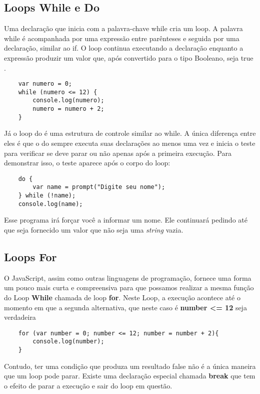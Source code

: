 \subsection{Loops While e Do}

Uma declaração que inicia com a palavra-chave while cria um loop. A palavra while é acompanhada por uma expressão entre parênteses e seguida por uma declaração, similar ao if. O loop continua executando a declaração enquanto a expressão produzir um valor que, após convertido para o tipo Booleano, seja true \cite{haverbeke2014eloquent}.

\begin{lstlisting}
	var numero = 0;
	while (numero <= 12) {
		console.log(numero);
		numero = numero + 2;
	}
\end{lstlisting}

Já o loop do é uma estrutura de controle similar ao while. A única diferença entre eles é que o do sempre executa suas declarações ao menos uma vez e inicia o teste para verificar se deve parar ou não apenas após a primeira execução. Para demonstrar isso, o teste aparece após o corpo do loop:

\begin{lstlisting}
	do {
		var name = prompt("Digite seu nome");
	} while (!name);
	console.log(name);
\end{lstlisting}

Esse programa irá forçar você a informar um nome. Ele continuará pedindo até que seja fornecido um valor que não seja uma \textit{string} vazia.

\subsection{Loops For}

O JavaScript, assim como outras linguagens de programação, fornece uma forma um pouco mais curta e compreensiva para que possamos realizar a mesma função do Loop \textbf{While} chamada de loop \textbf{for}. Neste Loop, a execução acontece até o momento em que a segunda alternativa, que neste caso é \textbf{number <= 12} seja verdadeira

\begin{lstlisting}
	for (var number = 0; number <= 12; number = number + 2){
		console.log(number);
	}
\end{lstlisting}

Contudo, ter uma condição que produza um resultado false não é a única maneira que um loop pode parar. Existe uma declaração especial chamada \textbf{break} que tem o efeito de parar a execução e sair do loop em questão.

